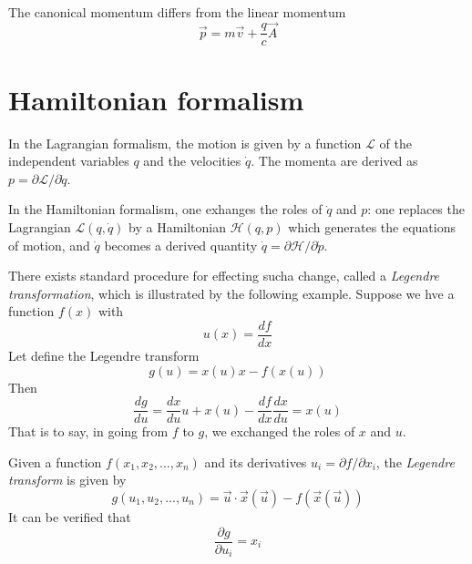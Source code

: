 \documentclass[11pt,fleqn]{book} %
\begin{document}
\begin{remark}
    The canonical momentum differs from the linear momentum
    \begin{equation}
        \label{eq:em_p}
        \vec{p}=m\vec{v}+\frac{q}{c}\vec{A}
    \end{equation}    
\end{remark}

\section*{Hamiltonian formalism}
In the Lagrangian formalism, the motion is given by a function $\mathcal{L}$ of the independent variables $q$ and the velocities $\dot q$.
The momenta are derived as $p=\partial\mathcal{L}/\partial\dot q$.

In the Hamiltonian formalism, one exhanges the roles of $\dot q$ and $p$: one replaces the Lagrangian $\mathcal{L}(q,\dot q)$ by a 
Hamiltonian $\mathcal{H}(q,p)$ which generates the equations of motion, and $\dot q$ becomes a derived quantity
$\dot q=\partial\mathcal{H}/\partial\dot p$.

There exists  standard procedure for effecting sucha change, called a \textit{Legendre transformation}, which is illustrated by the 
following example. Suppose we hve a function $f(x)$ with
\begin{equation*}
    u(x) = \frac{df}{dx}
\end{equation*}
Let define the Legendre transform
\begin{equation*}
    g(u)=x(u)x-f(x(u))
\end{equation*}
Then
\begin{equation*}
    \frac{dg}{du} = \frac{dx}{du}u+x(u)-\frac{df}{dx}\frac{dx}{du}=x(u)
\end{equation*}
That is to say, in going from $f$ to $g$, we exchanged the roles of $x$ and $u$.

\begin{definition}
    Given a function $f(x_1,x_2,...,x_n)$ and its derivatives $u_i=\partial f/\partial x_i$, 
    the \textit{Legendre transform} is given by
    \begin{equation*}
        g(u_1,u_2,...,u_n)=\vec{u}\cdot \vec{x}(\vec{u}) - f(\vec{x}(\vec{u}))
    \end{equation*}
    It can be verified that 
    \begin{equation*}
        \frac{\partial g}{\partial u_i}=x_i
    \end{equation*}
\end{definition}
\end{document}
